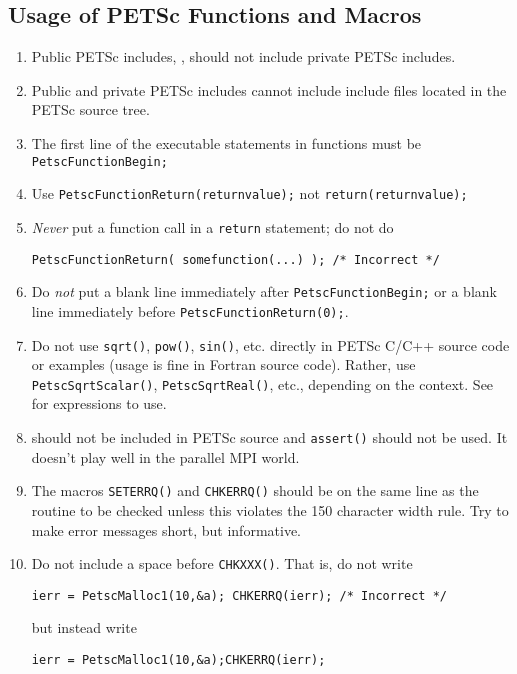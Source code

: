\subsection{Usage of PETSc Functions and Macros}
\label{sec:stylepetsc}
\begin{enumerate}
\item Public PETSc includes, , should not include private PETSc  includes.
\item Public and private PETSc includes cannot include include files located in the PETSc source tree.
\item The first line of the executable statements in functions must be \lstinline{PetscFunctionBegin;}
\item Use \lstinline{PetscFunctionReturn(returnvalue);} not \lstinline{return(returnvalue);}
\item {\em Never} put a function call in a \lstinline{return} statement; do not do
\begin{lstlisting}
PetscFunctionReturn( somefunction(...) ); /* Incorrect */
\end{lstlisting}
\item Do {\em not} put a blank line immediately after \lstinline{PetscFunctionBegin;} or
  a blank line immediately before \lstinline{PetscFunctionReturn(0);}.
\item Do not use \lstinline{sqrt()}, \lstinline{pow()}, \lstinline{sin()}, etc. directly in PETSc C/C++ source code or examples (usage is fine in Fortran source code). 
  Rather, use \lstinline{PetscSqrtScalar()}, \lstinline{PetscSqrtReal()}, etc., depending on the context. 
  See  for expressions to use.
\item {} should not be included in PETSc source and \lstinline{assert()} should not be used. It doesn't play well in the parallel MPI world.
\item The macros \lstinline{SETERRQ()} and \lstinline{CHKERRQ()} should be on the 
  same line as the routine to be checked unless this violates the
  150 character width rule. Try to make error messages short, but
  informative.
\item Do not include a space before \lstinline{CHKXXX()}. 
  That is, do not write
\begin{lstlisting}
ierr = PetscMalloc1(10,&a); CHKERRQ(ierr); /* Incorrect */
\end{lstlisting}
but instead write
\begin{lstlisting}
ierr = PetscMalloc1(10,&a);CHKERRQ(ierr);

\end{lstlisting}
\end{enumerate}
